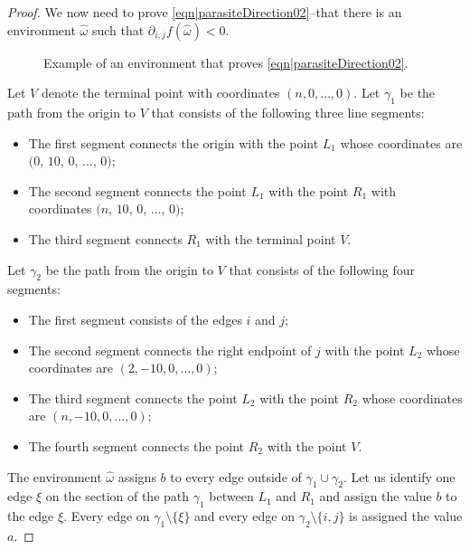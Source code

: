 \documentclass[reqno]{amsart}
\begin{document}
\begin{proof}
We now need to prove \eqref{eqn|parasiteDirection02}--that there is an environment $\hat \omega$ such that $\partial_{i,j}f(\hat \omega)<0$. 
 \begin{figure}[t]
 \centering
{}
\caption{Example of an environment that proves \eqref{eqn|parasiteDirection02}.}
 \label{fig|parasiteDirection02}
\end{figure}

Let $V$ denote the terminal point with coordinates $(n,0,\dots, 0)$.  
Let $\gamma_1$ be the path from the origin to $V$ that consists of the following three line segments:
\begin{itemize}
\item The first segment connects the origin with the point $L_1$ whose coordinates are $(0$, $10$, $0$, $\dots$, $0)$;
\item The second segment connects the point $L_1$ with the point $R_1$ with coordinates $(n$, $10$, $0$, $\dots$, $0)$;
\item The third segment connects $R_1$ with the terminal point $V$. 
\end{itemize} 
Let $\gamma_2$ be the path from the origin to $V$ that consists of the following four segments:
\begin{itemize} 
\item The first segment consists of the edges $i$ and $j$;
\item The second segment connects the right endpoint of $j$ with the point $L_2$ 
whose coordinates are $(2,-10,0,\dots, 0)$;
\item The third segment connects the point $L_2$ with the point $R_2$ whose coordinates are $(n,-10,0,\dots, 0)$;
\item The fourth segment connects the point $R_2$ with the point $V$.
\end{itemize}
The environment $\hat\omega$ assigns $b$ to every edge outside of $\gamma_1\cup \gamma_2$. 
Let us identify one edge $\xi$ on the section of the path $\gamma_1$ between $L_1$ and $R_1$ and assign the value $b$ to the edge $\xi$. Every edge on $\gamma_1\setminus\{\xi\}$ and every edge on $\gamma_2\setminus\{i,j\}$ is assigned the value $a$.


\end{proof}
\end{document}

